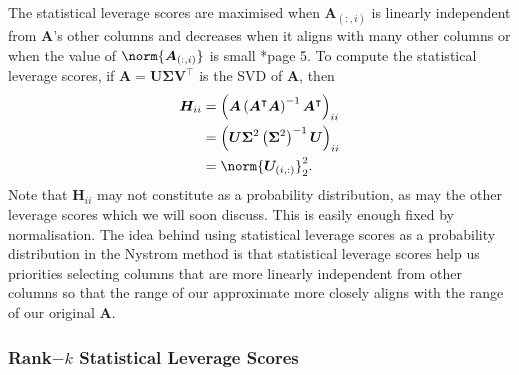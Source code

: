 The statistical leverage scores are maximised when $\bm{A}_{(:,i)}$ is linearly independent from $\bm{A}$'s other columns and decreases when it aligns with many other columns or when the value of $\norm{\bm{A}_{(:,i)}}$ is small \cite{DBLP:journals/corr/CohenMM15}*{page 5}. To compute the statistical leverage scores, if $\bm{A} = \bm{U} \bm{\Sigma} \bm{V}^{\intercal}$ is the SVD of $\bm{A}$, then
\begin{align*}
    \bm{H}_{ii} & = \left( \bm{A} \left( \bm{A}^{\intercal} \bm{A} \right)^{-1} \bm{A}^{\intercal} \right)_{ii} \\
                & = \left( \bm{U} \bm{\Sigma}^{2} \left( \bm{\Sigma}^{2} \right)^{-1} \bm{U} \right)_{ii}       \\
                & = \norm{\bm{U}_{(i,:)}}_2^2.
\end{align*}
Note that $\bm{H}_{ii}$ may not constitute as a probability distribution, as may the other leverage scores which we will soon discuss. This is easily enough fixed by normalisation. The idea behind using statistical leverage scores as a probability distribution in the Nystrom method is that statistical leverage scores help us priorities selecting columns that are more linearly independent from other columns so that the range of our approximate more closely aligns with the range of our original $\bm{A}$.

\subsubsection{Rank$-k$ Statistical Leverage Scores}

